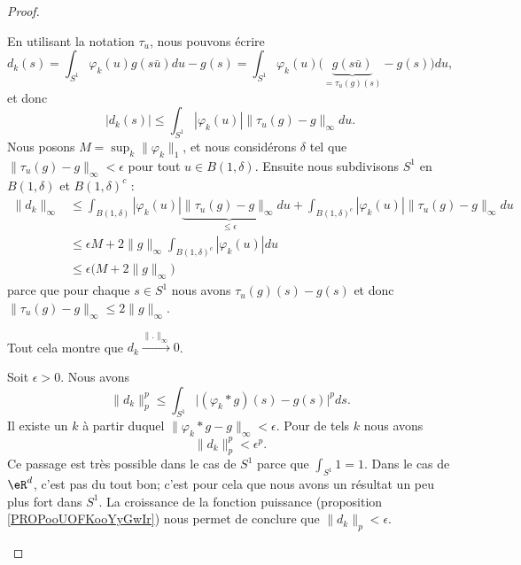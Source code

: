 \begin{proof}
\begin{subproof}
		En utilisant la notation \( \tau_u\), nous pouvons écrire
		\begin{equation}
			d_k(s)=\int_{S^1}\varphi_k(u)g(s\bar u)du-g(s)=\int_{S^1}\varphi_k(u)\big( \underbrace{ g(s\bar u)}_{=\tau_u(g)(s)}-g(s) \big)du,
		\end{equation}
		et donc
		\begin{equation}
			| d_k(s) |\leq \int_{S^1}| \varphi_k(u) |\| \tau_u(g)-g \|_{\infty}du.
		\end{equation}
		Nous posons \( M=\sup_k\| \varphi_k \|_1\), et nous considérons \( \delta\) tel que \( \| \tau_u(g)-g \|_{\infty}<\epsilon\) pour tout \( u\in B(1,\delta)\). Ensuite nous subdivisons \( S^1\) en \( B(1,\delta)\) et \( B(1,\delta)^c\) :
		\begin{subequations}
			\begin{align}
				\| d_k \|_{\infty} & \leq \int_{B(1,\delta)}| \varphi_k(u) |\underbrace{\| \tau_u(g)-g \|_{\infty}}_{\leq \epsilon}du+\int_{B(1,\delta)^c}| \varphi_k(u) |\| \tau_u(g)-g \|_{\infty}du \\
				                   & \leq\epsilon M+2\| g \|_{\infty}\int_{B(1,\delta)^c}| \varphi_k(u) |du                                                                                            \\
				                   & \leq \epsilon\big( M+2\| g \|_{\infty} \big)
			\end{align}
		\end{subequations}
		parce que pour chaque \( s\in S^1\) nous avons \( \tau_u(g)(s)-g(s)\) et donc \( \| \tau_u(g)-g \|_{\infty}\leq 2\| g \|_{\infty}\).

		Tout cela montre que \( d_k\stackrel{\| . \|_{\infty}}{\longrightarrow}0\).


		Soit \( \epsilon>0\). Nous avons
		\begin{equation}
			\| d_k \|_p^p\leq \int_{S^1}\big| (\varphi_k*g)(s)-g(s) \big|^pds.
		\end{equation}
		Il existe un \( k\) à partir duquel \( \| \varphi_k*g-g \|_{\infty}<\epsilon\). Pour de tels \( k\) nous avons
		\begin{equation}
			\| d_k \|_p^p<\epsilon^p.
		\end{equation}
		Ce passage est très possible dans le cas de \( S^1\) parce que \( \int_{S^1}1=1\). Dans le cas de \( \eR^d\), c'est pas du tout bon; c'est pour cela que nous avons un résultat un peu plus fort dans \( S^1\). La croissance de la fonction puissance (proposition \ref{PROPooUOFKooYyGwIr}) nous permet de conclure que \( \| d_k \|_p<\epsilon\).


\end{subproof}
\end{proof}
